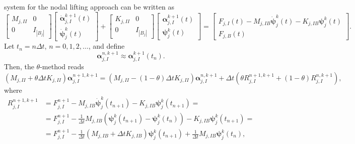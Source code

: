\documentclass[a4paper, 11pt]{article}
\theoremstyle{remark}
\begin{document}
\begin{enumerate}[label = (\arabic*)]
system for the nodal lifting approach can be written as
\begin{equation*}
    \begin{bmatrix}
        M_{j, II} & 0\\
        0 & I_{|B_{j}|}
    \end{bmatrix}
    \begin{bmatrix}
        \boldsymbol{\dot{\alpha}}_{j, I}^{k+1}(t)\\
        \boldsymbol{\dot{\psi}}_{j}^{k}(t)
    \end{bmatrix}
    + 
    \begin{bmatrix}
        K_{j, II} & 0\\
        0 & I_{|B_{j}|}
    \end{bmatrix}
    \begin{bmatrix}
        \boldsymbol{\alpha}_{j, I}^{k+1}(t)\\
        \boldsymbol{\psi}_{j}^{k}(t)
    \end{bmatrix}
    =
    \begin{bmatrix}
        F_{j, I}(t) - M_{j, IB}\boldsymbol{\dot{\psi}}_{j}^{k}(t) - K_{j, IB}\boldsymbol{\psi}_{j}^{k}(t)\\
        F_{j, B}(t)
    \end{bmatrix}.
\end{equation*}
Let $t_n = n \Delta t$, $n=0,1,2,\dots$, and define
\begin{equation*}
    \boldsymbol{\alpha}_{j, I}^{n, k+1} \approx \boldsymbol{\alpha}_{j, I}^{k+1}(t_n).    
\end{equation*}
Then, the $\theta$-method reads
\begin{equation*}
    \left(M_{j, II} + \theta\Delta t K_{j, II}\right) \boldsymbol{\alpha}_{j, I}^{n+1, k+1} = \left(M_{j, II} - (1-\theta)\Delta t K_{j, II}\right)\boldsymbol{\alpha}_{j, I}^{n, k+1} + \Delta t\left(\theta R^{n+1, k+1}_{j, I} + (1-\theta)R^{n, k+1}_{j, I}\right),
\end{equation*}
where
\begin{align*}
    R^{n+1, k+1}_{j, I} &= F^{n+1}_{j, I} - M_{j, IB}\boldsymbol{\dot{\psi}}_{j}^{k}(t_{n+1}) - K_{j, IB}\boldsymbol{\psi}_{j}^{k}(t_{n+1}) =\\
    &=F^{n+1}_{j, I} - \frac{1}{\Delta t}M_{j, IB}\left(\boldsymbol{\psi}_{j}^{k}(t_{n+1}) - \boldsymbol{\psi}_{j}^{k}(t_{n})\right) - K_{j, IB}\boldsymbol{\psi}_{j}^{k}(t_{n+1}) =\\
    &= F^{n+1}_{j, I} - \frac{1}{\Delta t}\left(M_{j, IB} +\Delta t K_{j, IB}\right)\boldsymbol{\psi}_{j}^{k}(t_{n+1}) + \frac{1}{\Delta t}M_{j, IB}\boldsymbol{\psi}_{j}^{k}(t_{n}),

\end{align*}
\end{enumerate}
\end{document}
